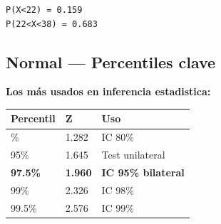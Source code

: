 \documentclass[
  letterpaper,
  DIV=11,
  numbers=noendperiod]{scrartcl}
\newcounter{none} %
\begin{document}
\begin{verbatim}
P(X<22) = 0.159 
P(22<X<38) = 0.683
\end{verbatim}

\subsection{Normal --- Percentiles
clave}\label{normal-percentiles-clave}

\textbf{Los más usados en inferencia estadistica:}

{\def\LTcaptype{none} %
\begin{longtable}[]{@{}lll@{}}
\toprule\noalign{}
Percentil & Z & Uso \\
\midrule\noalign{}
\endhead
\bottomrule\noalign{}
\endlastfoot
90\% & 1.282 & IC 80\% \\
95\% & 1.645 & Test unilateral \\
\textbf{97.5\%} & \textbf{1.960} & \textbf{IC 95\% bilateral} \\
99\% & 2.326 & IC 98\% \\
99.5\% & 2.576 & IC 99\% \\
\end{longtable}
}
\end{document}
